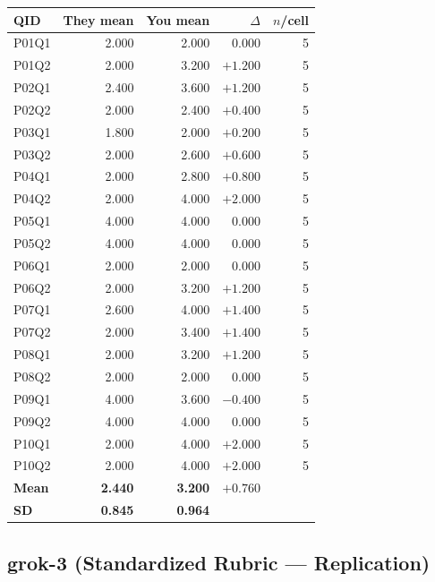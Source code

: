 \documentclass[12pt, letterpaper]{article}
\begin{document}
\begin{center}
\small
\begin{tabular}{lrrrr}
\toprule
\textbf{QID} & \textbf{They mean} & \textbf{You mean} & \textbf{$\Delta$} & \textbf{$n$/cell} \\
\midrule
P01Q1 & 2.000 & 2.000 & $0.000$  & 5 \\
P01Q2 & 2.000 & 3.200 & $+1.200$ & 5 \\
P02Q1 & 2.400 & 3.600 & $+1.200$ & 5 \\
P02Q2 & 2.000 & 2.400 & $+0.400$ & 5 \\
P03Q1 & 1.800 & 2.000 & $+0.200$ & 5 \\
P03Q2 & 2.000 & 2.600 & $+0.600$ & 5 \\
P04Q1 & 2.000 & 2.800 & $+0.800$ & 5 \\
P04Q2 & 2.000 & 4.000 & $+2.000$ & 5 \\
P05Q1 & 4.000 & 4.000 & $0.000$  & 5 \\
P05Q2 & 4.000 & 4.000 & $0.000$  & 5 \\
P06Q1 & 2.000 & 2.000 & $0.000$  & 5 \\
P06Q2 & 2.000 & 3.200 & $+1.200$ & 5 \\
P07Q1 & 2.600 & 4.000 & $+1.400$ & 5 \\
P07Q2 & 2.000 & 3.400 & $+1.400$ & 5 \\
P08Q1 & 2.000 & 3.200 & $+1.200$ & 5 \\
P08Q2 & 2.000 & 2.000 & $0.000$  & 5 \\
P09Q1 & 4.000 & 3.600 & $-0.400$ & 5 \\
P09Q2 & 4.000 & 4.000 & $0.000$  & 5 \\
P10Q1 & 2.000 & 4.000 & $+2.000$ & 5 \\
P10Q2 & 2.000 & 4.000 & $+2.000$ & 5 \\
\midrule
\textbf{Mean} & \textbf{2.440} & \textbf{3.200} & \textbf{$+0.760$} & \\
\textbf{SD}   & \textbf{0.845} & \textbf{0.964} & & \\
\bottomrule
\end{tabular}
\end{center}

\subsection*{grok-3 (Standardized Rubric --- Replication)}
\end{document}
